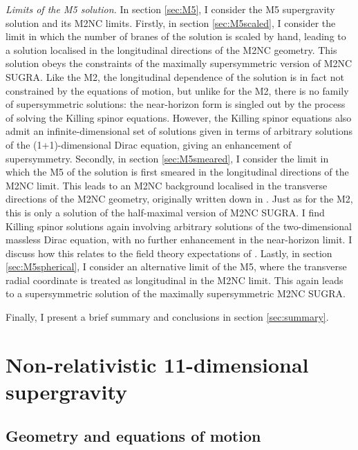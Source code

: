 \documentclass[11pt]{article}
\numberwithin{equation}{section}
\begin{document}
{{\vspace{0.5em}\noindent 
\emph{Limits of the M5 solution.}
In section \ref{sec:M5}, I consider the M5 supergravity solution and its M2NC limits.
Firstly, in section \ref{sec:M5scaled}, I consider the limit in which the number of branes of the solution is scaled by hand, leading to a solution localised in the longitudinal directions of the M2NC geometry.
This solution obeys the constraints of the maximally supersymmetric version of M2NC SUGRA.
Like the M2, the longitudinal dependence of the solution is in fact not constrained by the equations of motion, but unlike for the M2, there is no family of supersymmetric solutions: the near-horizon form is singled out by the process of solving the Killing spinor equations. 
However, the Killing spinor equations also admit an infinite-dimensional set of solutions given in terms of arbitrary solutions of the (1+1)-dimensional Dirac equation, giving an enhancement of supersymmetry.
Secondly, in section \ref{sec:M5smeared}, I consider the limit in which the M5 of the solution is first smeared in the longitudinal directions of the M2NC limit.
This leads to an M2NC background localised in the transverse directions of the M2NC geometry, originally written down in \cite{Lambert:2024ncn}.
Just as for the M2, this is only a solution of the half-maximal version of M2NC SUGRA.
I find Killing spinor solutions again involving arbitrary solutions of the two-dimensional massless Dirac equation, with no further enhancement in the near-horizon limit. I discuss how this relates to the field theory expectations of \cite{Lambert:2024yjk}.
Lastly, in section \ref{sec:M5spherical}, I consider an alternative limit of the M5, where the transverse radial coordinate is treated as longitudinal in the M2NC limit.
This again leads to a supersymmetric solution of the maximally supersymmetric M2NC SUGRA.

\vspace{1em}
\noindent
Finally, I present a brief summary and conclusions in section \ref{sec:summary}.

\section{Non-relativistic 11-dimensional supergravity} 
\label{sec:setting}

\subsection{Geometry and equations of motion} 
\label{sec:bosons}

}}
\end{document}
